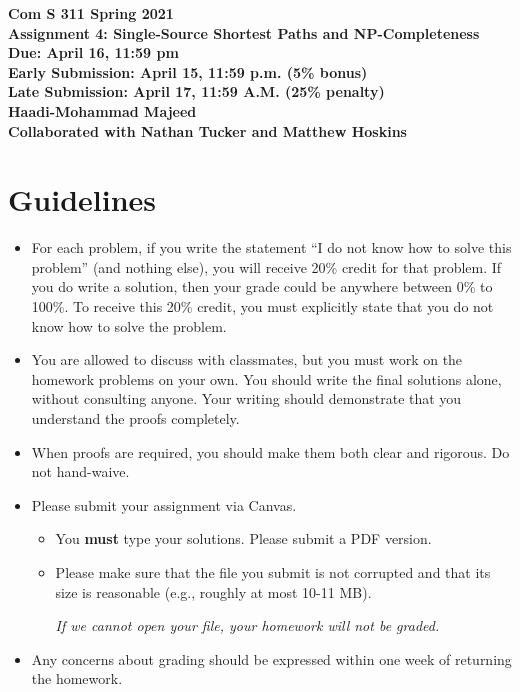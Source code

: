 \documentclass[12pt]{article}
\begin{document}
\pagestyle{plain}

\begin{center}
{\bf Com S 311 Spring 2021 \\}
{\Large \bf Assignment 4: Single-Source Shortest Paths and NP-Completeness \\}
{\bf Due: April 16, 11:59 pm \\}
{\bf Early Submission: April 15, 11:59 p.m. (5\% bonus) \\}
{\bf Late Submission: April 17, 11:59 A.M. (25\% penalty) }
\textbf{\\Haadi-Mohammad Majeed\\Collaborated with Nathan Tucker and Matthew Hoskins} 

\end{center}

\section*{\large Guidelines}

\begin{itemize}

\item %
For each problem, if you write  the statement ``I do not know how to solve this problem'' (and nothing else), you will receive 20\% credit for that problem. If you do write a solution, then your grade could be anywhere between 0\% to 100\%.
To receive this 20\% credit, you must explicitly state that you do not know how to solve the problem.

\item You are allowed to discuss with classmates, but you must work on the homework problems on your own.  You should write the final solutions alone, without consulting anyone. Your writing should demonstrate that you understand the proofs completely.

\item When proofs are required, you should make them both clear and rigorous. Do not hand-waive.

 \item Please submit your assignment via Canvas.
 \begin{itemize}
\item  You \textbf{must} type your solutions. Please submit a PDF version.
\item Please make sure that the file you submit is not corrupted and that its size is reasonable (e.g., roughly at most 10-11 MB).
\begin{center}
\emph{If we cannot open your file, your homework will not be graded.}
\end{center}
\end{itemize}

\item Any concerns about grading should be expressed within one week of
returning the homework.

\end{itemize}
\end{document}
